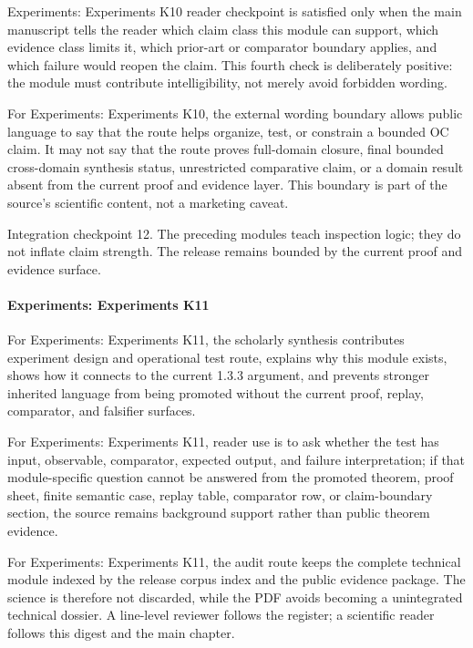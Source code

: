 Experiments: Experiments K10 reader checkpoint is satisfied only when the main manuscript tells the reader which claim class this module can support, which evidence class limits it, which prior-art or comparator boundary applies, and which failure would reopen the claim. This fourth check is deliberately positive: the module must contribute intelligibility, not merely avoid forbidden wording.


For Experiments: Experiments K10, the external wording boundary allows public language to say that the route helps organize, test, or constrain a bounded OC claim. It may not say that the route proves full-domain closure, final bounded cross-domain synthesis status, unrestricted comparative claim, or a domain result absent from the current proof and evidence layer. This boundary is part of the source's scientific content, not a marketing caveat.


Integration checkpoint 12. The preceding modules teach inspection logic; they do not inflate claim strength. The release remains bounded by the current proof and evidence surface.


\paragraph{Experiments: Experiments K11}

For Experiments: Experiments K11, the scholarly synthesis contributes experiment design and operational test route, explains why this module exists, shows how it connects to the current 1.3.3 argument, and prevents stronger inherited language from being promoted without the current proof, replay, comparator, and falsifier surfaces.


For Experiments: Experiments K11, reader use is to ask whether the test has input, observable, comparator, expected output, and failure interpretation; if that module-specific question cannot be answered from the promoted theorem, proof sheet, finite semantic case, replay table, comparator row, or claim-boundary section, the source remains background support rather than public theorem evidence.


For Experiments: Experiments K11, the audit route keeps the complete technical module indexed by the release corpus index and the public evidence package. The science is therefore not discarded, while the PDF avoids becoming a unintegrated technical dossier. A line-level reviewer follows the register; a scientific reader follows this digest and the main chapter.


